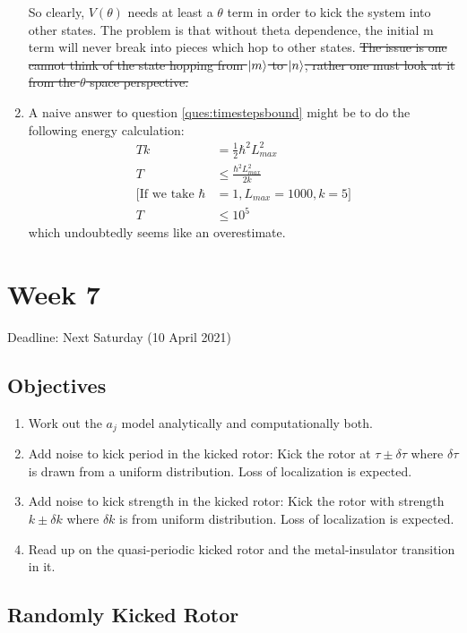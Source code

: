 \documentclass[12pt]{article}
\begin{document}
\begin{enumerate}
    So clearly, $V(\theta)$ needs at least a $\theta$ term in order to kick the system into other states. The
    problem is that without theta dependence, the initial m term will never break into pieces which hop to other
    states. \sout{The issue is one cannot think of the state hopping from $\ket{m}$ to $\ket{n}$, rather one must look at it from the $\theta$ space perspective.}
    
    \item A naive answer to question \ref{ques:timestepsbound} might be to do the following energy calculation:
    \begin{align}
        T k &= \frac{1}{2} \hbar^2 L_{max}^2 \\
        T &\leq \frac{\hbar^2 L_{max}^2}{2 k} \\
        [\text{If we take } \hbar &= 1, L_{max} = 1000, k = 5] \nonumber \\
        T &\leq 10^5
    \end{align}
    which undoubtedly seems like an overestimate.
\end{enumerate}

\section{Week 7}
Deadline: Next Saturday (10 April 2021)
\subsection{Objectives}
\begin{enumerate}
    \item Work out the $a_j$ model analytically and computationally both.
    
    \item Add noise to kick period in the kicked rotor:
    Kick the rotor at $\tau \pm \delta\tau$ where $\delta\tau$ is drawn from a uniform distribution.
    Loss of localization is expected.
    
    \item Add noise to kick strength in the kicked rotor:
    Kick the rotor with strength $k \pm \delta k$ where $\delta k$ is from uniform distribution.
    Loss of localization is expected.
    
    \item Read up on the quasi-periodic kicked rotor and the metal-insulator transition in it.
\end{enumerate}

\subsection{Randomly Kicked Rotor}
\begin{equation}
    
\end{equation}


\nocite{*}
\printbibliography
\end{document}
